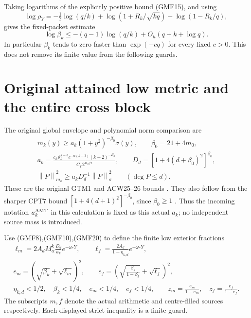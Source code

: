 \documentclass[11pt]{article}
\newcommand{\norm}[1]{\left\lVert#1\right\rVert}
\begin{document}
Taking logarithms of the explicitly positive bound (GMF15),
and using
\[
 \log\rho_Y
 =-\tfrac12\log(q/k)
   +\log(1+R_k/\sqrt{kq})-\log(1-R_k/q),
\]
gives the fixed-packet estimate
\begin{equation}\tag{GMF19}
 \log\beta_k
 \le-(q-1)\log(q/k)+O_h(q+k+\log q).
\end{equation}
In particular \(\beta_k\) tends to zero faster than
\(\exp(-c q)\) for every fixed \(c>0\).
This does not remove its finite value from the following guards.

\section{Original attained low metric and the entire cross block}

The original global envelope and polynomial norm comparison are
\begin{equation}\tag{GMF20}
\begin{gathered}
 m_k(y)\ge a_k(1+y^2)^{-\beta_0}\sigma(y),\qquad
 \beta_0=21+4m_0,\\
 a_k=\frac{c_h\vartheta_h^{k-3}e^{-\alpha(k-3)}(k-2)^{-B_h}}
                 {C_\Gamma 2^{B_h/2}},\qquad
 D_d=[1+4(d+\beta_0)^2]^{\beta_0},\\
 \norm P_{m_k}^2\ge a_kD_d^{-1}\norm P_\sigma^2
                    \qquad(\deg P\le d).
\end{gathered}
\end{equation}
These are the original GTM1 and ACW25--26 bounds
\cite{providers,centralProvider}.  They also follow from
the sharper CPT7 bound
\([1+4(d+1)^2]^{-\beta_0}\), since \(\beta_0\ge1\)
\cite{cpt}.  Thus the incoming notation \(a_k^{\rm AMT}\)
in this calculation is fixed as this actual \(a_k\); no
independent source mass is introduced.

Use (GMF8),(GMF10),(GMF20) to define the finite low exterior
fractions
\begin{equation}\tag{GMF21}
\begin{gathered}
 \ell_m=
 2A_dM_\alpha^k\frac{D_d}{a_k}e^{-\omega_*Y},\qquad
 \ell_f=\frac{2A_d}{1-\eta_{k,d}}e^{-\omega_*Y},\\
 e_m=(\sqrt{\beta_k}+\sqrt{\ell_m})^2,\qquad
 e_f=\left(\sqrt{\frac{\beta_k}{1-\beta_k}}
                              +\sqrt{\ell_f}\right)^2,\\
 \eta_{k,d}<1/2,\quad \beta_k<1/4,\quad
 e_m<1/4,\quad e_f<1/4,\qquad
 z_m=\frac{e_m}{1-e_m},\quad z_f=\frac{e_f}{1-e_f}.
\end{gathered}
\end{equation}
The subscripts \(m,f\) denote the actual arithmetic and
centre-filled sources respectively.
Each displayed strict inequality is a finite guard.
\end{document}
